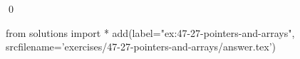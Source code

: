 
\begin{ex}
  \label{ex:47-27-pointers-and-arrays}
  
  \qed
\end{ex}
\begin{python0}
from solutions import *
add(label="ex:47-27-pointers-and-arrays",
    srcfilename='exercises/47-27-pointers-and-arrays/answer.tex')
\end{python0}
